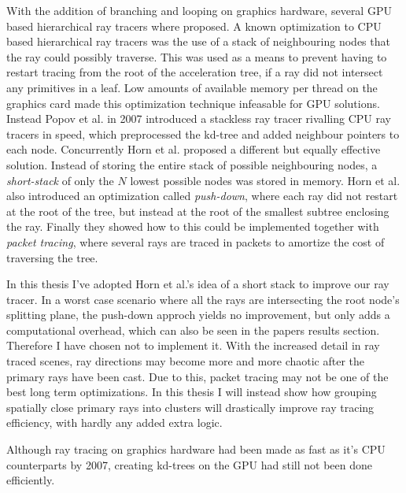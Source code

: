With the addition of branching and looping on graphics hardware,
several GPU based hierarchical ray tracers where proposed. A known
optimization to CPU based hierarchical ray tracers was the use of a
stack of neighbouring nodes that the ray could possibly traverse. This
was used as a means to prevent having to restart tracing from the root
of the acceleration tree, if a ray did not intersect any primitives in
a leaf. Low amounts of available memory per thread on the graphics
card made this optimization technique infeasable for GPU
solutions. Instead Popov et al. in 2007
introduced a stackless ray tracer rivalling CPU ray tracers in speed,
which preprocessed the kd-tree and added neighbour pointers to each
node. Concurrently Horn et al. proposed a different
but equally effective solution. Instead of storing the entire stack of
possible neighbouring nodes, a \textit{short-stack} of only the $N$
lowest possible nodes was stored in memory. Horn et al. also
introduced an optimization called \textit{push-down}, where each ray
did not restart at the root of the tree, but instead at the root of
the smallest subtree enclosing the ray. Finally they showed how to
this could be implemented together with \textit{packet tracing}, where
several rays are traced in packets to amortize the cost of traversing
the tree.


In this thesis I've adopted Horn et al.'s idea of a short stack to
improve our ray tracer. In a worst case scenario where all the rays
are intersecting the root node's splitting plane, the push-down approch
yields no improvement, but only adds a computational overhead, which
can also be seen in the papers results section. Therefore I have
chosen not to implement it. With the increased detail in ray traced
scenes, ray directions may become more and more chaotic after the
primary rays have been cast. Due to this, packet tracing may not be
one of the best long term optimizations. In this thesis I will instead
show how grouping spatially close primary rays into clusters will
drastically improve ray tracing efficiency, with hardly any added
extra logic.



Although ray tracing on graphics hardware had been made as fast as
it's CPU counterparts by 2007, creating kd-trees on the GPU had still
not been done efficiently.


